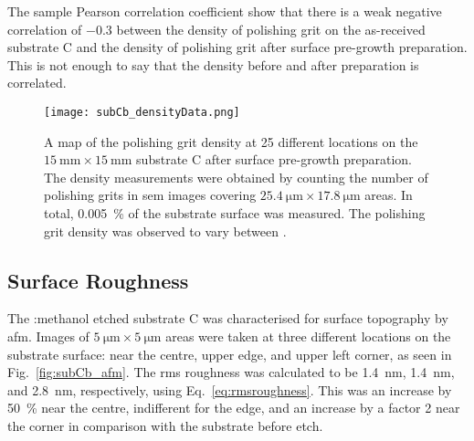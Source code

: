  The sample Pearson correlation coefficient show that there is a weak negative correlation of \SI{-0.3}{} between the density of polishing grit on the as-received substrate C and the density of polishing grit after surface pre-growth preparation. This is not enough to say that the density before and after preparation is correlated.

\begin{figure}[htbp]
    \centering
    \texttt{[image: subCb\_densityData.png]}
    \caption[Map of the polishing grit density on substrate C after surface pre-growth preparation.]{A map of the polishing grit density at 25 different locations on the $\SI{15}{\milli\metre}\times\SI{15}{\milli\metre}$ substrate C after surface pre-growth preparation. The density measurements were obtained by counting the number of polishing grits in \ac{sem} images covering $\SI{25.4}{\micro\metre}\times\SI{17.8}{\micro\metre}$ areas. In total, \SI{0.005}{\percent} of the substrate surface was measured. The polishing grit density was observed to vary between .}
    \label{fig:subCb_densityData}
\end{figure}


\subsection{Surface Roughness}

The :methanol etched substrate C was characterised for surface topography by \ac{afm}. Images of $\SI{5}{\micro\metre}\times\SI{5}{\micro\metre}$ areas were taken at three different locations on the substrate surface: near the centre, upper edge, and upper left corner, as seen in Fig.~\ref{fig:subCb_afm}. The \ac{rms} roughness was calculated to be \SI{1.4}{\nano\metre}, \SI{1.4}{\nano\metre}, and \SI{2.8}{\nano\metre}, respectively, using Eq.~\ref{eq:rmsroughness}. This was an increase by \SI{50}{\percent} near the centre, indifferent for the edge, and an increase by a factor 2 near the corner in comparison with the substrate before etch.


